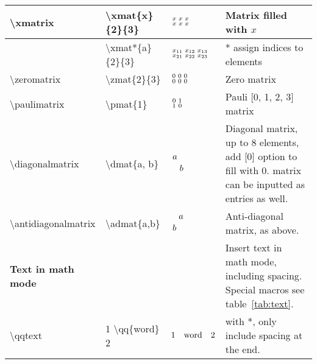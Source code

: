 \documentclass{article}
\def\tbs{\textbackslash}
\begin{document}
\begin{longtable}{l||l|l|p{6cm}}
\tbs xmatrix              & \tbs xmat\{x\}\{2\}\{3\}         & $\begin{matrix}\smqty{\xmat{x}{2}{3}}\end{matrix}$  & Matrix filled with $x$
\\ \hline
                          & \tbs xmat*\{a\}\{2\}\{3\}        & $\begin{matrix}\smqty{\xmat*{x}{2}{3}}\end{matrix}$ & * assign indices to elements
\\ \hline
\tbs zeromatrix           & \tbs zmat\{2\}\{3\}              & $\begin{matrix}\smqty{\zmat{2}{3}}\end{matrix}$    & Zero matrix
\\ \hline
\tbs paulimatrix          & \tbs pmat\{1\}                   & $\begin{matrix}\smqty{\pmat{1}}\end{matrix}$       & Pauli [0, 1, 2, 3] matrix
\\ \hline
\tbs diagonalmatrix       & \tbs dmat\{a, b\}                & $\begin{matrix}\smqty{\dmat{a,b}}\end{matrix}$     & Diagonal matrix, up to 8 elements, add [0] option to fill with 0. matrix can be inputted as entries as well.
\\ \hline
\tbs antidiagonalmatrix   & \tbs admat\{a,b\}                & $\begin{matrix}\smqty{\admat{a,b}}\end{matrix}$    & Anti-diagonal matrix, as above.
\\ \hline \hline
\textbf{Text in math mode}&                                  &                           & Insert text in math mode, including spacing. Special macros see table~\ref{tab:text}.
\\ \hline
\tbs qqtext               & 1 \tbs qq\{word\} 2              & $1\qq{word}2$             & with *, only include spacing at the end.
\end{longtable}
\end{document}
